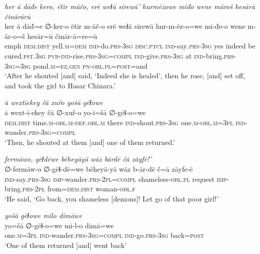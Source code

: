 \ea \label{ZP.61}
\textit{her ā dāđe kero, ētir māčo, erē weɫā sirewā’ hurmēzowe miđo wene māroš hesārū činārārū} \\ 
\gll her ā dāđ=e ∅-ker-o ētir m-āč-o erē weɫā sirewā hur-m-ēz-o=we mi-đe-o wene m-ār-o=š hesār=ū činār-ā=re=ū \\ 
 emph \textsc{dem.dist} yell\textsc{.m}\textsc{=dem} \textsc{ind-}do\textsc{.prs}\textsc{-3sg} \textsc{disc.ptcl} \textsc{ind-}say\textsc{.prs}\textsc{-3sg} yes indeed be cured\textsc{.pst}\textsc{.3sg} \textsc{pvb-}\textsc{ind-}rise\textsc{.prs}\textsc{-3sg}\textsc{=compl} \textsc{ind-}give\textsc{.prs}\textsc{-3sg} at \textsc{ind-}bring\textsc{.prs}\textsc{-3sg}\textsc{=3sg} pond\textsc{.m}\textsc{\textsc{=ez.gen}} \textsc{pn}\textsc{-obl}\textsc{.pl}\textsc{=\textsc{post}}=and \\ 
\glt `After he shouted [and] said, ‘Indeed she is healed’, then he rose, [and] set off, and took the girl to Hasar Chinara.'
\z 
 
\ea \label{ZP.68}
\textit{ā wextīekey čā xuřo yošā gēɫowe} \\ 
\gll ā wext-ī-ekey čā ∅-xuř-o yo-ī=šā ∅-gēɫ-o=we \\ 
 \textsc{dem.dist} time\textsc{.m}\textsc{-obl}\textsc{.m}\textsc{-def}\textsc{.obl}\textsc{.m} there \textsc{ind-}shout\textsc{.prs}\textsc{-3sg} one\textsc{.m}\textsc{-obl}\textsc{.m}\textsc{=3pl} \textsc{ind-}wander\textsc{.prs}\textsc{-3sg}\textsc{=compl} \\ 
\glt `Then, he shouted at them [and] one of them returned.'
\z 
 
\ea \label{ZP.70}
\textit{fermāwo, gēɫdēwe bēheyāyā wāz bārdē čā zāyfē!’} \\ 
\gll ∅-fermāw-o ∅-gēɫ-dē=we bēheyā-yā wāz b-ār-dē č=ā zāyfe-ē \\ 
 \textsc{ind-}say\textsc{.prs}\textsc{-3sg} \textsc{imp-}wander\textsc{.prs}-\textsc{2pl}\textsc{=compl} shameless\textsc{-obl}\textsc{.pl} request \textsc{imp-}bring\textsc{.prs}-\textsc{2pl} from=\textsc{dem.dist} woman\textsc{-obl}\textsc{.f} \\ 
\glt `He said, ‘Go back, you shameless [demons]! Let go of that poor girl!'
\z 
 
\ea \label{ZP.71}
\textit{yošā gēɫowe milo dimāwe} \\ 
\gll yo=šā ∅-gēɫ-o=we mi-l-o dimā=we \\ 
 one\textsc{.m}\textsc{=3pl} \textsc{ind-}wander\textsc{.prs}\textsc{-3sg}\textsc{=compl} \textsc{ind-}go\textsc{.prs}\textsc{-3sg} back\textsc{=\textsc{post}} \\ 
\glt `One of them returned [and] went back'
\z 
 
